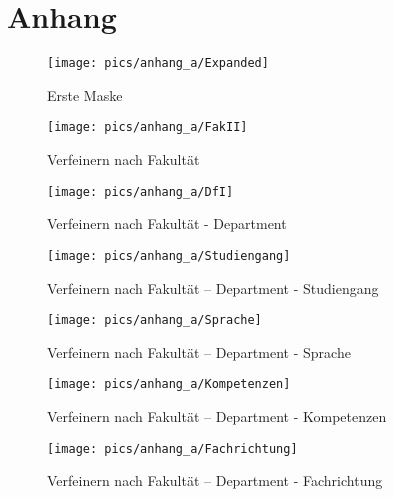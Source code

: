 \section{Anhang}
\captionsetup{list=no}
\setcounter{figure}{0}

\begin{figure}[hp]%
    \centering
    \texttt{[image: pics/anhang\_a/Expanded]}\\
    \caption{Erste Maske}
\end{figure}
\cleardoublepage

\begin{figure}[hp]%
    \centering
    \texttt{[image: pics/anhang\_a/FakII]}\\
    \caption{Verfeinern nach Fakultät}
\end{figure}
\cleardoublepage

\begin{figure}[hp]%
    \centering
    \texttt{[image: pics/anhang\_a/DfI]}\\
    \caption{Verfeinern nach Fakultät - Department}
\end{figure}
\cleardoublepage

\begin{figure}[hp]%
    \centering
    \texttt{[image: pics/anhang\_a/Studiengang]}\\
    \caption{Verfeinern nach Fakultät – Department - Studiengang}
\end{figure}
\cleardoublepage

\begin{figure}[hp]%
    \centering
    \texttt{[image: pics/anhang\_a/Sprache]}\\
    \caption{Verfeinern nach Fakultät – Department - Sprache}
\end{figure}
\cleardoublepage

\begin{figure}[hp]%
    \centering
    \texttt{[image: pics/anhang\_a/Kompetenzen]}\\
    \caption{Verfeinern nach Fakultät – Department - Kompetenzen}
\end{figure}
\cleardoublepage

\begin{figure}[hp]%
    \centering
    \texttt{[image: pics/anhang\_a/Fachrichtung]}\\
    \caption{Verfeinern nach Fakultät – Department - Fachrichtung}
\end{figure}
\cleardoublepage

